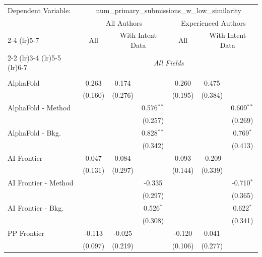 \begingroup
\centering
\begin{tabular}{lcccccc}
   \tabularnewline \midrule \midrule
   Dependent Variable: & \multicolumn{6}{c}{num\_primary\_submissions\_w\_low\_similarity}\\
 & \multicolumn{3}{c}{All Authors} & \multicolumn{3}{c}{Experienced Authors} \\
\cmidrule(lr){2-4} \cmidrule(lr){5-7}
 & \multicolumn{1}{c}{All} & \multicolumn{2}{c}{With Intent Data} & \multicolumn{1}{c}{All} & \multicolumn{2}{c}{With Intent Data} \\
\cmidrule(lr){2-2} \cmidrule(lr){3-4} \cmidrule(lr){5-5} \cmidrule(lr){6-7}
 & \multicolumn{6}{c}{\textit{All Fields}} \\ \\
   AlphaFold            & 0.263   & 0.174   &              & 0.260        & 0.475   &   \\   
                        & (0.160) & (0.276) &              & (0.195)      & (0.384) &   \\   
   AlphaFold - Method   &         &         & 0.576$^{**}$ &              &         & 0.609$^{**}$\\   
                        &         &         & (0.257)      &              &         & (0.269)\\   
   AlphaFold - Bkg.     &         &         & 0.828$^{**}$ &              &         & 0.769$^{*}$\\   
                        &         &         & (0.342)      &              &         & (0.413)\\   
   AI Frontier          & 0.047   & 0.084   &              & 0.093        & -0.209  &   \\   
                        & (0.131) & (0.297) &              & (0.144)      & (0.339) &   \\   
   AI Frontier - Method &         &         & -0.335       &              &         & -0.710$^{*}$\\   
                        &         &         & (0.297)      &              &         & (0.365)\\   
   AI Frontier - Bkg.   &         &         & 0.526$^{*}$  &              &         & 0.622$^{*}$\\   
                        &         &         & (0.308)      &              &         & (0.341)\\   
   PP Frontier          & -0.113  & -0.025  &              & -0.120       & 0.041   &   \\   
                        & (0.097) & (0.219) &              & (0.106)      & (0.277) &   \\   

\end{tabular}
